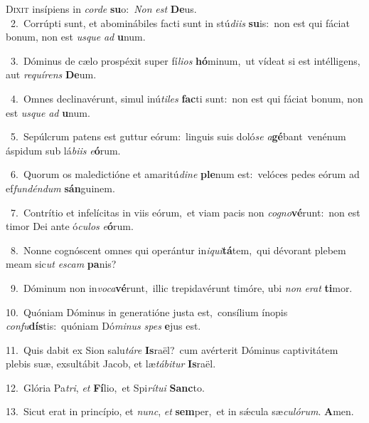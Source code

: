 \lettrine{\initial\textcolor{\initialcolor}{D}}{ixit} insípiens in \textit{cor}\-\textit{de} \textbf{su}\-o:~\star \textit{Non} \textit{est} \textbf{De}\-us.\\
{\numbfont\textcolor{\numbcolor}{~2.}}~Corrúpti sunt, et abominábiles facti sunt in stú\-\textit{di}\-\textit{is} \textbf{su}\-is:~\star non est qui fáciat bonum, non est \textit{us}\-\textit{que} \textit{ad} \textbf{u}\-num.\par
{\numbfont\textcolor{\numbcolor}{~3.}}~Dóminus de cælo prospéxit super fí\-\textit{li}\-\textit{os} \textbf{hó}\-minum,~\star ut vídeat si est intélligens, aut \textit{re}\-\textit{quí}\textit{rens} \textbf{De}\-um.\par
{\numbfont\textcolor{\numbcolor}{~4.}}~Omnes declinavérunt, simul inú\-\textit{ti}\-\textit{les} \textbf{fac}\-ti sunt:~\star non est qui fáciat bonum, non est \textit{us}\-\textit{que} \textit{ad} \textbf{u}\-num.\par
{\numbfont\textcolor{\numbcolor}{~5.}}~Sepúlcrum patens est guttur eórum:~\dagger linguis suis doló\textit{se} \textit{a}\-\textbf{gé}bant~\star venénum áspidum sub lá\-\textit{bi}\-\textit{is} \textit{e}\-\textbf{ó}rum.\par
{\numbfont\textcolor{\numbcolor}{~6.}}~Quorum os maledictióne et amaritú\-\textit{di}\-\textit{ne} \textbf{ple}\-num est:~\star velóces pedes eórum ad ef\-\textit{fun}\-\textit{dén}\textit{dum} \textbf{sán}\-guinem.\par
{\numbfont\textcolor{\numbcolor}{~7.}}~Contrítio et infelícitas in viis eórum,~\dagger et viam pacis non \textit{co}\-\textit{gno}\textbf{vé}runt:~\star non est timor Dei ante ó\-\textit{cu}\-\textit{los} \textit{e}\-\textbf{ó}rum.\par
{\numbfont\textcolor{\numbcolor}{~8.}}~Nonne cognóscent omnes qui operántur in\-\textit{i}\-\textit{qui}\textbf{tá}tem,~\star qui dévorant plebem meam sic\textit{ut} \textit{es}\-\textit{cam} \textbf{pa}\-nis?\par
{\numbfont\textcolor{\numbcolor}{~9.}}~Dóminum non in\-\textit{vo}\-\textit{ca}\textbf{vé}runt,~\star illic trepidavérunt timóre, ubi \textit{non} \textit{e}\-\textit{rat} \textbf{ti}\-mor.\par
{\numbfont\textcolor{\numbcolor}{10.}}~Quóniam Dóminus in generatióne justa est,~\dagger consílium ínopis \textit{con}\-\textit{fu}\textbf{dís}tis:~\star quóniam Dó\-\textit{mi}\-\textit{nus} \textit{spes} \textbf{e}\-jus est.\par
{\numbfont\textcolor{\numbcolor}{11.}}~Quis dabit ex Sion salu\-\textit{tá}\-\textit{re} \textbf{Is}\-raël?~\star cum avérterit Dóminus captivitátem plebis suæ, exsultábit Jacob, et læ\-\textit{tá}\-\textit{bi}\textit{tur} \textbf{Is}\-raël.\par
{\numbfont\textcolor{\numbcolor}{12.}}~Glória Pa\-\textit{tri}\-, \textit{et} \textbf{Fí}\-lio,~\star et Spi\-\textit{rí}\-\textit{tu}\textit{i} \textbf{Sanc}\-to.\par
{\numbfont\textcolor{\numbcolor}{13.}}~Sicut erat in princípio, et \textit{nunc}\-, \textit{et} \textbf{sem}\-per,~\star et in sǽcula sæ\-\textit{cu}\-\textit{ló}\textit{rum}. \textbf{A}\-men.\par
